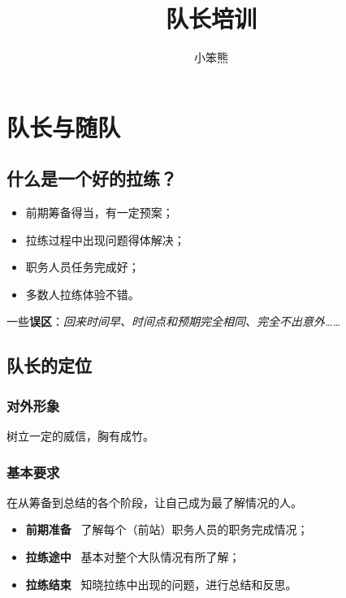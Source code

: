 \documentclass[UTF8]{ctexart}
\title{队长培训}
\author{小笨熊}
\begin{document}
\maketitle

\tableofcontents

\clearpage

\section{队长与随队}

\subsection{什么是一个好的拉练？}

\begin{itemize}[nosep,left=2em]
    \item 前期筹备得当，有一定预案；
    \item 拉练过程中出现问题得体解决；
    \item 职务人员任务完成好；
    \item 多数人拉练体验不错。
\end{itemize}

一些\textbf{误区}：\textit{回来时间早、时间点和预期完全相同、完全不出意外……}

\subsection{队长的定位}

\subsubsection{对外形象}

树立一定的威信，胸有成竹。

\subsubsection{基本要求}

在从筹备到总结的各个阶段，让自己成为最了解情况的人。
\begin{itemize}[nosep,left=2em]
    \item \textbf{前期准备} \ 了解每个（前站）职务人员的职务完成情况；
    \item \textbf{拉练途中} \ 基本对整个大队情况有所了解；
    \item \textbf{拉练结束} \ 知晓拉练中出现的问题，进行总结和反思。
\end{itemize}
\end{document}

